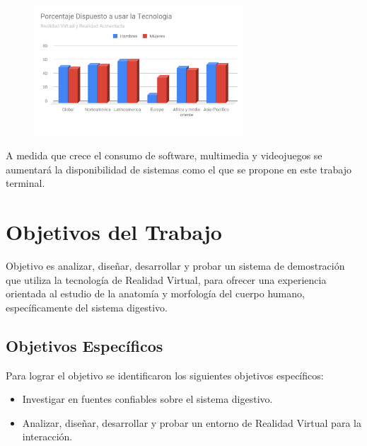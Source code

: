 \begin{figure}[H]
\begin{center}
\includegraphics[width = 0.7\textwidth]{source/images/image10.png}
\end{center} 
\end{figure}

A medida que crece el consumo de software, 
multimedia y videojuegos se aumentará la disponibilidad de sistemas 
como el que se propone en este trabajo terminal.

\section{Objetivos del Trabajo}
Objetivo es analizar, diseñar, desarrollar y probar un sistema de demostración que utiliza la tecnología de Realidad Virtual, para ofrecer una experiencia orientada al estudio de la anatomía y morfología del cuerpo humano, específicamente del sistema digestivo.

\subsection{Objetivos Específicos}
Para lograr el objetivo se identificaron los siguientes objetivos específicos:
\begin{itemize}
\item Investigar en fuentes confiables sobre el sistema digestivo.
\item Analizar, diseñar, desarrollar y probar un entorno de Realidad Virtual para la interacción.
\end{itemize}

